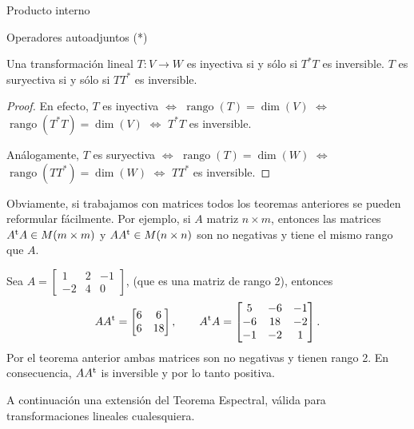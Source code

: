 \begin{chapter}{Producto interno}
\begin{section}{Operadores autoadjuntos (*)}
        
        
        \begin{corolario}\label{cor5.27}
            Una transformación lineal $T: V \to W$ es inyectiva si y sólo si $T^*T$ es inversible. $T$ es suryectiva si y sólo si $TT^*$ es inversible.
        \end{corolario}
        \begin{proof}
            En  efecto, $T$ es inyectiva $\Leftrightarrow$  $\operatorname{rango}(T) = \dim(V)$ $\Leftrightarrow$  $\operatorname{rango}(T^*T) = \dim(V)$   $\Leftrightarrow$  $T^*T$  es inversible.
            
            Análogamente, $T$ es suryectiva   $\Leftrightarrow$  $\operatorname{rango}(T) = \dim(W)$ $\Leftrightarrow$ $\operatorname{rango}(TT^*) = \dim(W)$   $\Leftrightarrow$  $TT^*$  es inversible.
        \end{proof}
        
        \begin{observacion*}
            Obviamente, si trabajamos con matrices todos  los teoremas anteriores se pueden reformular fácilmente. Por  ejemplo, si $A$ matriz $n \times m$, entonces  las  matrices $A^{{\operatorname{t}}}A \in M(m \times m)$ y $AA^{{\operatorname{t}}} \in M(n \times n)$ son  no negativas y tiene el mismo rango que $A$. 
        \end{observacion*}
        
        \begin{ejemplo*}
            Sea $A = \begin{bmatrix}
            1&2&-1 \\
            -2& 4&0
            \end{bmatrix}$, (que es una matriz de rango 2), entonces
            $$
            AA^{{\operatorname{t}}} = \begin{bmatrix}
            6&6\\6&18
            \end{bmatrix}, \qquad 
            A^{{\operatorname{t}}}A = \begin{bmatrix}
            5&-6&-1\\-6&18&-2\\ -1&-2&1
            \end{bmatrix}.
            $$
            Por el  teorema  anterior ambas matrices son no negativas y tienen rango 2. En  consecuencia, $AA^{{\operatorname{t}}}$ is inversible y  por lo tanto positiva.
        \end{ejemplo*}
        
        A continuación una extensión del Teorema Espectral, válida para transformaciones lineales cualesquiera.
        

\end{section}
\end{chapter}
